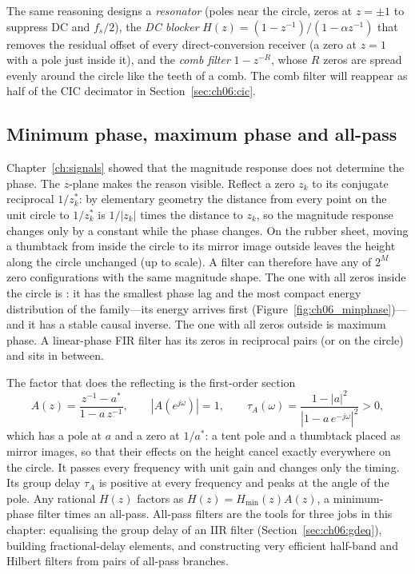 The same reasoning designs a \emph{resonator} (poles near the circle, zeros at $z=\pm1$ to suppress
DC and $f_s/2$), the \emph{DC blocker} $H(z)=(1-z^{-1})/(1-\alpha z^{-1})$ that removes the
residual offset of every direct-conversion receiver (a zero at $z=1$ with a pole just inside it),
and the \emph{comb filter} $1-z^{-R}$, whose $R$ zeros are spread evenly around the circle like the
teeth of a comb. The comb filter will reappear as half of the CIC decimator in
Section~\ref{sec:ch06:cic}.

\subsection{Minimum phase, maximum phase and all-pass}

Chapter~\ref{ch:signals} showed that the magnitude response does not determine the phase. The
$z$-plane makes the reason visible. Reflect a zero $z_k$ to its conjugate reciprocal $1/z_k^*$:
by elementary geometry the distance from every point on the unit circle to $1/z_k^*$ is
$1/|z_k|$ times the distance to $z_k$, so the magnitude response changes only by a constant while
the phase changes. On the rubber sheet, moving a thumbtack from inside the circle to its mirror
image outside leaves the height along the circle unchanged (up to scale). A filter can therefore
have any of $2^M$ zero configurations with the same magnitude shape. The one with all zeros inside
the circle is : it has the smallest phase lag and the most compact energy
distribution of the family---its energy arrives first (Figure~\ref{fig:ch06_minphase})---and it has
a stable causal inverse. The one with all zeros outside is maximum phase. A linear-phase FIR filter
has its zeros in reciprocal pairs (or on the circle) and sits in between.


The factor that does the reflecting is the first-order  section
\begin{equation}
A(z)=\frac{z^{-1}-a^*}{1-a\,z^{-1}},\qquad |A(e^{j\omega})|=1,\qquad
\tau_A(\omega)=\frac{1-|a|^2}{|1-a\,e^{-j\omega}|^2}>0,
\label{eq:ch06:allpass}
\end{equation}
which has a pole at $a$ and a zero at $1/a^*$: a tent pole and a thumbtack placed as mirror images,
so that their effects on the height cancel exactly everywhere on the circle. It passes every
frequency with unit gain and changes only the timing. Its group delay $\tau_A$ is positive at every
frequency and peaks at the angle of the pole. Any rational $H(z)$ factors as $H(z)=H_{\min}(z)
A(z)$, a minimum-phase filter times an all-pass. All-pass filters are the tools for three jobs in
this chapter: equalising the group delay of an IIR filter (Section~\ref{sec:ch06:gdeq}), building
fractional-delay elements, and constructing very efficient half-band and Hilbert filters from
pairs of all-pass branches.

